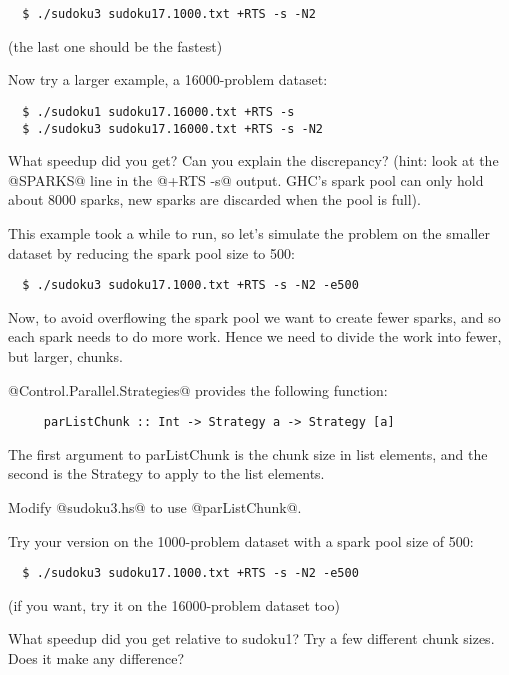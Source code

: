 \documentclass[11pt,a4paper]{article}
\begin{document}
{\small \begin{verbatim}
  $ ./sudoku3 sudoku17.1000.txt +RTS -s -N2
\end{verbatim}}

\noindent (the last one should be the fastest)

Now try a larger example, a 16000-problem dataset:

{\small \begin{verbatim}
  $ ./sudoku1 sudoku17.16000.txt +RTS -s
  $ ./sudoku3 sudoku17.16000.txt +RTS -s -N2
\end{verbatim}}

What speedup did you get?  Can you explain the discrepancy? (hint:
look at the @SPARKS@ line in the @+RTS -s@ output.  GHC's spark pool
can only hold about 8000 sparks, new sparks are discarded when the
pool is full).

This example took a while to run, so let's simulate the problem on the
smaller dataset by reducing the spark pool size to 500:

{\small \begin{verbatim}
  $ ./sudoku3 sudoku17.1000.txt +RTS -s -N2 -e500
\end{verbatim}}

Now, to avoid overflowing the spark pool we want to create fewer
sparks, and so each spark needs to do more work.  Hence we need to
divide the work into fewer, but larger, chunks.

@Control.Parallel.Strategies@ provides the following function:

{\small \begin{verbatim}
     parListChunk :: Int -> Strategy a -> Strategy [a]
\end{verbatim}}

The first argument to parListChunk is the chunk size in list elements,
and the second is the Strategy to apply to the list elements.

Modify @sudoku3.hs@ to use @parListChunk@.

Try your version on the 1000-problem dataset with a spark pool size of 500:

{\small \begin{verbatim}
  $ ./sudoku3 sudoku17.1000.txt +RTS -s -N2 -e500
\end{verbatim}}

\noindent (if you want, try it on the 16000-problem dataset too)

What speedup did you get relative to sudoku1?  Try a few different
chunk sizes.  Does it make any difference?
\end{document}
